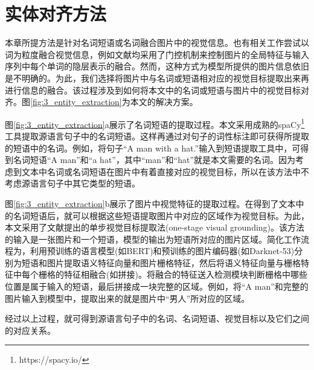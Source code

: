 \section{实体对齐方法}
\label{sec:3_entity_extraction}
本章所提方法是针对名词短语或名词融合图片中的视觉信息。也有相关工作尝试以词为粒度融合视觉信息，例如文献\cite{20_wu-etal-2021-good,22_li-etal-2021-vision}均采用了门控机制来控制图片的全局特征与输入序列中每个单词的隐层表示的融合。然而，这种方式为模型所提供的图片信息依旧是不明确的。为此，我们选择将图片中与名词或短语相对应的视觉目标提取出来再进行信息的融合。该过程涉及到如何将本文中的名词或短语与图片中的视觉目标对齐。图\ref{fig:3_entity_extraction}为本文的解决方案。


图\ref{fig:3_entity_extraction}a展示了名词短语的提取过程。本文采用成熟的spaCy\footnote{https://spacy.io/}工具提取源语言句子中的名词短语。这样再通过对句子的词性标注即可获得所提取的短语中的名词。例如，将句子“A man with a hat.”输入到短语提取工具中，可得到名词短语“A man”和“a hat”，其中“man”和“hat”就是本文需要的名词。因为考虑到文本中名词或名词短语在图片中有着直接对应的视觉目标，所以在该方法中不考虑源语言句子中其它类型的短语。

图\ref{fig:3_entity_extraction}b展示了图片中视觉特征的提取过程。在得到了文本中的名词短语后，就可以根据这些短语提取图片中对应的区域作为视觉目标。为此，本文采用了文献\cite{24_DBLP:conf/iccv/YangGWHYL19}提出的单步视觉目标提取法(one-stage visual grounding)。该方法的输入是一张图片和一个短语，模型的输出为短语所对应的图片区域。简化工作流程为，利用预训练的语言模型(如BERT\cite{25_DBLP:conf/naacl/DevlinCLT19})和预训练的图片编码器(如Darknet-53\cite{26_DBLP:journals/corr/abs-1804-02767})分别为短语和图片提取语义特征向量和图片栅格特征，然后将语义特征向量与栅格特征中每个栅格的特征相融合(如拼接)。将融合的特征送入检测模块判断栅格中哪些位置是属于输入的短语，最后拼接成一块完整的区域。例如，将“A man”和完整的图片输入到模型中，提取出来的就是图片中“男人”所对应的区域。

经过以上过程，就可得到源语言句子中的名词、名词短语、视觉目标以及它们之间的对应关系。